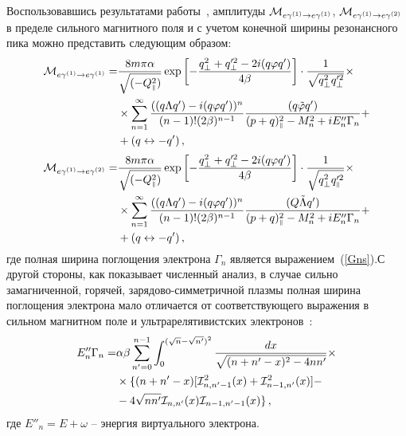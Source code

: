 Воспользовавшись результатами работы~\cite{Chistyakov:2009}, амплитуды ${\cal M}_{e\gamma^{(1)}\to e\gamma^{(1)}}$, ${\cal M}_{e\gamma^{(1)}\to e\gamma^{(2)}}$ в пределе сильного магнитного поля и с учетом конечной ширины резонансного пика можно представить следующим образом:
\begin{equation}\label{Mres}
	\begin{aligned}
		{\cal M}_{e\gamma^{(1)}\to e\gamma^{(1)}}=& \frac{8m\pi\alpha}{\sqrt{(-Q^2_{\mbox{\tiny $\|$}})}} \exp\left[-\frac{q^2_\perp+q'^2_\perp-2i(q\varphi q')}{4\beta}\right]\cdot\frac{1}{\sqrt{q^2_\perp q'^2_\perp}}\times 
		\\ &\times \sum_{n=1}^{\infty}\frac{((q\Lambda
			q')-i(q\varphi
			q'))^{n}}{(n-1)!(2\beta)^{n-1}}
		\frac{(q\tilde{\varphi}q')}{(p+q)^2_{\mbox{\tiny $\|$}}-M_n^2+iE''_n\Gamma_n }+\\
		&+(q\leftrightarrow-q')\, ,
	\end{aligned}
\end{equation}
\begin{equation}\label{Mres12}
	\begin{aligned}
		{\cal M}_{e\gamma^{(1)}\to e\gamma^{(2)}}=& \frac{8m\pi\alpha}{\sqrt{(-Q^2_{\mbox{\tiny $\|$}})}} \exp\left[-\frac{q^2_\perp+q'^2_\perp-2i(q\varphi q')}{4\beta}\right]\cdot\frac{1}{\sqrt{q^2_\perp q'^2_{\mbox{\tiny $\|$}}}}\times 
		\\ &\times \sum_{n=1}^{\infty}\frac{((q\Lambda
			q')-i(q\varphi
			q'))^{n}}{(n-1)!(2\beta)^{n-1}}
		\frac{(Q\tilde{\Lambda}q')}{(p+q)^2_{\mbox{\tiny $\|$}}-M_n^2+iE''_n\Gamma_n }+\\
		&+(q\leftrightarrow-q')\, ,
	\end{aligned}
\end{equation}
где полная ширина поглощения электрона $\Gamma_n$  является выражением~(\ref{Gns}).С другой стороны, как показывает численный анализ, в случае сильно замагниченной, горячей, зарядово-симметричной плазмы полная ширина поглощения электрона мало отличается от соответствующего выражения в сильном магнитном поле и ультрарелятивистских электронов~\cite{KM_Book_2013}:
\begin{equation}\label{Shir}
	\begin{aligned}
		E''_n\Gamma_n=&\alpha \beta \sum_{n'=0}^{n-1}\int_{0}^{(\sqrt{n}-\sqrt{n'})^2}\frac{dx}{\sqrt{(n+n'-x)^2-4n n'}}\times\\
		&\times\{(n+n'-x)[{\cal I}^2_{n,n'-1}(x)+{\cal I}^2_{n-1,n'}(x)]-\\
		&-4\sqrt{nn'}{\cal I}_{n,n'}(x){\cal I}_{n-1,n'-1}(x)\}\, ,
	\end{aligned}
\end{equation}
где $E''_n=E+\omega$ -- энергия виртуального электрона.

